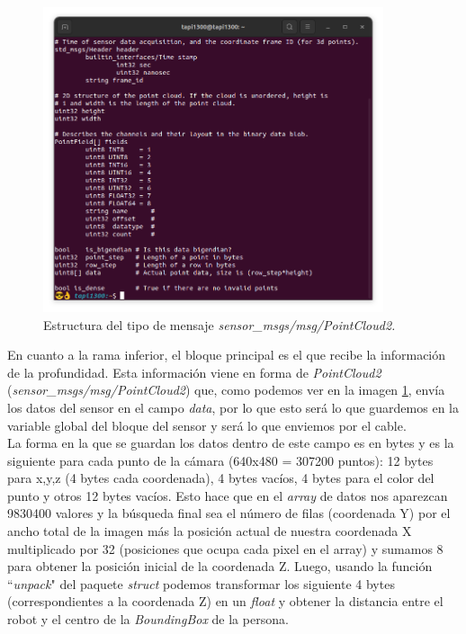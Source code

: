 \begin{figure} [H]
    \begin{center}
        \includegraphics[width=10cm]{figs/c5/PointCloud2_data.png}
    \end{center}
    \caption[Estructura mensaje PointCloud2]{Estructura del tipo de mensaje \textit{sensor\_msgs/msg/PointCloud2.}}
    \label{fig:PC2_struct}
\end{figure}


En cuanto a la rama inferior, el bloque principal es el que recibe la información de la profundidad. Esta información viene en forma
de \textit{PointCloud2} (\textit{sensor\_msgs/msg/PointCloud2}) que, como  podemos ver en la imagen \ref{fig:PC2_struct}, envía los datos del sensor en el
campo \textit{data}, por lo que esto será lo que guardemos en la variable global del bloque del sensor y será lo que enviemos por el cable.\\

La forma en la que se guardan los datos dentro de este campo es en bytes y es la siguiente para cada punto de la cámara (640x480 = 307200 puntos):
12 bytes para x,y,z (4 bytes cada coordenada), 4 bytes vacíos, 4 bytes para el color del punto y otros 12 bytes vacíos. Esto hace que en el \textit{array} de datos
nos aparezcan 9830400 valores y la búsqueda final sea el número de filas (coordenada Y) por el ancho total de la imagen más la posición actual de nuestra coordenada X
multiplicado por 32 (posiciones que ocupa cada pixel en el array) y sumamos 8 para obtener la posición inicial de la coordenada Z. Luego, usando la función
``\textit{unpack}" del paquete \textit{struct} podemos transformar los siguiente 4 bytes (correspondientes a la coordenada Z) en un \textit{float} y obtener
la distancia entre el robot y el centro de la \textit{BoundingBox} de la persona.

